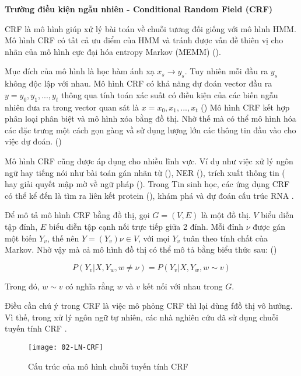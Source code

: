 \documentclass[../main.tex]{subfiles}
\begin{document}
\textbf{Trường điều kiện ngẫu nhiên - Conditional Random Field (CRF) }

CRF là mô hình giúp xử lý bài toán về chuỗi tương đối giống với mô hình HMM. Mô hình CRF có tất cả ưu điểm của HMM và tránh được vấn đề thiên vị cho nhãn của mô hình cực đại hóa entropy Markov (MEMM) (\cite{mccallum2000maximum}). 

Mục đích của mô hình là học hàm ánh xạ $x_{s} \rightarrow y_{s}$. Tuy nhiên mỗi đầu ra $y_{s}$ không độc lập với nhau. Mô hình CRF có khả năng dự đoán vector đầu ra $y = y_{0}, y_{1}, ..., y_{t}$ thông qua tính toán xác suất có điều kiện của các biến ngẫu nhiên đưa ra trong vector quan sát là $x = x_{0}, x_{1}, ..., x_{t}$ (\cite{sutton2012introduction})
Mô hình CRF kết hợp phân loại phân biệt và mô hình xóa bằng đồ thị. Nhờ thế mà có thể mô hình hóa các đặc trưng một cách gọn gàng vầ sử dụng lượng lớn các thông tin đầu vào cho việc dự đoán. (\cite{sutton2012introduction})

Mô hình CRF cũng được áp dụng cho nhiều lĩnh vực. Ví dụ như việc xử lý ngôn ngữ hay tiếng nói như bài toán gán nhãn từ (\cite{ghosh2016part}), NER (\cite{seker2017extending}), trích xuất thông tin (\cite{ebersbach2016wrappers} hay giải quyết mập mờ về ngữ pháp (\cite{radziszewski2013tiered}). Trong Tin sinh học, các ứng dụng CRF có thể kể đến là tìm ra liên kết protein (\cite{morales2018protein}), khám phá và dự đoán cấu trúc RNA \cite{johansen2017deep}. 

Để mô tả mô hình CRF bằng đồ thị, gọi $G = (V,  E)$ là một đồ thị. $V$ biểu diễn tập đỉnh, $E$ biểu diễn tập cạnh nối trực tiếp giữa 2 đỉnh. Mỗi đỉnh $\nu$ được gán một biến $Y_{v}$, thế nên $Y = (Y_{v})\nu \in V$, với mọi $Y_{v}$ tuân theo tính chất của Markov. Nhờ vậy mà cả mô hình đồ thị có thể mô tả bằng biểu thức sau: (\cite{lafferty2001conditional})

\begin{equation}
P(Y_{v}|X, Y_{w}, w \neq \nu) = P(Y_{v}|X, Y_{w}, w \sim v) \nonumber
\end{equation}

Trong đó, $ w \sim v$ có nghĩa rằng $w$ và $v$ kết nối với nhau trong $G$. 

Điều cần chú ý trong CRF là việc mô phỏng CRF thì lại dùng fđồ thị vô hướng. Vì thế, trong xử lý ngôn ngữ tự nhiên, các nhà nghiên cứu đã sử dụng chuỗi tuyến tính CRF  \cite{yu2019named}. 

\begin{figure}[h]
\centering
\texttt{[image: 02-LN-CRF]}
\caption{Cấu trúc của mô hình chuỗi tuyến tính CRF}
\end{figure}
\end{document}
